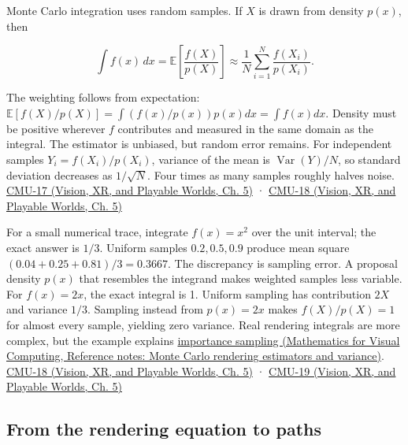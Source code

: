 Monte Carlo integration uses random samples. If \(X\) is drawn from density \(p(x)\), then

\[
\int f(x)\,dx=\mathbb E\left[\frac{f(X)}{p(X)}\right]\approx\frac1N\sum_{i=1}^N\frac{f(X_i)}{p(X_i)}.
\]

The weighting follows from expectation: \(\mathbb E[f(X)/p(X)]=\int (f(x)/p(x))p(x)dx=\int f(x)dx\). Density must be positive wherever \(f\) contributes and measured in the same domain as the integral. The estimator is unbiased, but random error remains. For independent samples \(Y_i=f(X_i)/p(X_i)\), variance of the mean is \(\operatorname{Var}(Y)/N\), so standard deviation decreases as \(1/\sqrt N\). Four times as many samples roughly halves noise. \href{../07-Vision-XR-and-Playable-Worlds/main.pdf\#nameddest=04-visual-computing-ii-ch036-cmu-17---numerical-integration}{CMU-17 (Vision, XR, and Playable Worlds, Ch. 5)} · \href{../07-Vision-XR-and-Playable-Worlds/main.pdf\#nameddest=04-visual-computing-ii-ch036-cmu-18---monte-carlo-rendering}{CMU-18 (Vision, XR, and Playable Worlds, Ch. 5)}

For a small numerical trace, integrate \(f(x)=x^2\) over the unit interval; the exact answer is \(1/3\). Uniform samples \(0.2,0.5,0.9\) produce mean square \((0.04+0.25+0.81)/3=0.3667\). The discrepancy is sampling error. A proposal density \(p(x)\) that resembles the integrand makes weighted samples less variable. For \(f(x)=2x\), the exact integral is 1. Uniform sampling has contribution \(2X\) and variance \(1/3\). Sampling instead from \(p(x)=2x\) makes \(f(X)/p(X)=1\) for almost every sample, yielding zero variance. Real rendering integrals are more complex, but the example explains \href{../02-Mathematics-for-Visual-Computing/main.pdf\#nameddest=appendix-031e02bf28af}{importance sampling (Mathematics for Visual Computing, Reference notes: Monte Carlo rendering estimators and variance)}. \href{../07-Vision-XR-and-Playable-Worlds/main.pdf\#nameddest=04-visual-computing-ii-ch036-cmu-18---monte-carlo-rendering}{CMU-18 (Vision, XR, and Playable Worlds, Ch. 5)} · \href{../07-Vision-XR-and-Playable-Worlds/main.pdf\#nameddest=04-visual-computing-ii-ch036-cmu-19---variance-reduction}{CMU-19 (Vision, XR, and Playable Worlds, Ch. 5)}

\subsection{From the rendering equation to paths}\label{03-visual-computing-i-ch011-from-the-rendering-equation-to-paths}

